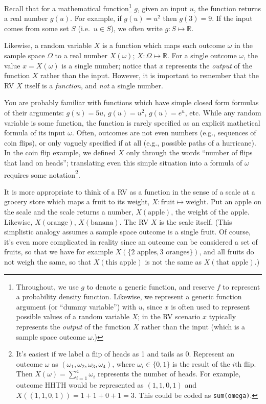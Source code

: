 \documentclass[
]{book}
\theoremstyle{definition}
\theoremstyle{definition}
\theoremstyle{definition}
\theoremstyle{remark}
\begin{document}
Recall that for a mathematical function\footnote{Throughout, we use \(g\) to denote a generic function, and reserve \(f\) to represent a probability density function. Likewise, we represent a generic function argument (or ``dummy variable'') with \(u\), since \(x\) is often used to represent possible values of a random variable \(X\); in the RV scenario \(x\) typically represents the \emph{output} of the function \(X\) rather than the input (which is a sample space outcome \(\omega\).)} \(g\), given an input \(u\), the function returns a real number \(g(u)\). For example, if \(g(u) = u^2\) then \(g(3) = 9\). If the input comes from some set \(S\) (i.e.~\(u\in S\)), we often write \(g:S\mapsto \mathbb{R}\).

Likewise, a random variable \(X\) is a function which maps each outcome \(\omega\) in the sample space \(\Omega\) to a real number \(X(\omega)\); \(X:\Omega\mapsto\mathbb{R}\). For a single outcome \(\omega\), the value \(x = X(\omega)\) is a single number; notice that \(x\) represents the \emph{output} of the function \(X\) rather than the input. However, it is important to remember that the RV \(X\) itself is a \emph{function}, and \emph{not} a single number.

You are probably familiar with functions which have simple closed form formulas of their arguments: \(g(u)=5u\), \(g(u)=u^2\), \(g(u)=e^u\), etc. While any random variable is some function, the function is rarely specified as an explicit mathetical formula of its input \(\omega\). Often, outcomes are not even numbers (e.g., sequences of coin flips), or only vaguely specified if at all (e.g., possible paths of a hurricane). In the coin flip example, we defined \(X\) only through the words ``number of flips that land on heads''; translating even this simple situation into a formula of \(\omega\) requires some notation\footnote{It's easiest if we label a flip of heads as 1 and tails as 0. Represent an outcome \(\omega\) as \((\omega_1, \omega_2, \omega_3, \omega_4)\), where \(\omega_i\in\{0,1\}\) is the result of the \(i\)th flip. Then \(X(\omega)=\sum_{i=1}^{4} \omega_i\) represents the number of heads. For example, outcome HHTH would be represented as \((1, 1, 0, 1)\) and \(X((1, 1, 0, 1)) = 1 + 1 + 0 + 1 = 3\). This could be coded as \texttt{sum(omega)}.}.

It is more appropriate to think of a RV as a function in the sense of a scale at a grocery store which maps a fruit to its weight, \(X: \text{fruit}\mapsto\text{weight}\). Put an apple on the scale and the scale returns a number, \(X(\text{apple})\), the weight of the apple. Likewise, \(X(\text{orange})\), \(X(\text{banana})\). The RV \(X\) is the scale itself. (This simplistic analogy assumes a sample space outcome is a single fruit. Of course, it's even more complicated in reality since an outcome can be considered a set of fruits, so that we have for example \(X(\{\text{2 apples}, \text{3 oranges}\})\), and all fruits do not weigh the same, so that \(X(\text{this apple})\) is not the same as \(X(\text{that apple})\).)
\end{document}

